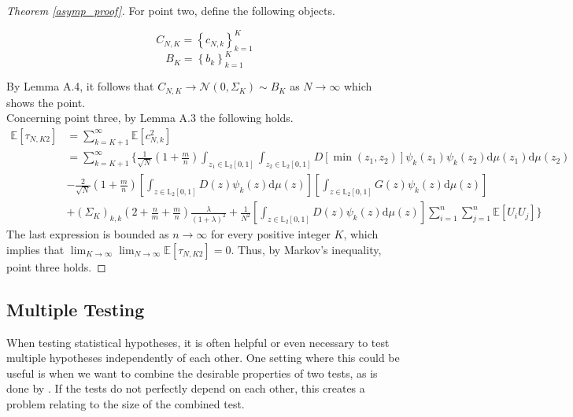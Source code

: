 \documentclass[12pt, a4paper]{article}
\theoremstyle{MAstyle} \newtheorem{assumption}{Assumption}[section]
\theoremstyle{MAstyle} \newtheorem{definition}{Definition}[section]
\theoremstyle{MAstyle} \newtheorem{theorem}{Theorem}[section]
\begin{document}
\begin{proof}[Theorem \ref{asymp_proof}]
		For point two, define the following objects.
		\begin{multicols}{2}
			\noindent
			\begin{equation*}
				C_{N,K} = \left\{c_{N,k}\right\}_{k=1}^K
			\end{equation*}
			\begin{equation}
				B_{K} = \left\{b_{k}\right\}_{k=1}^K
			\end{equation}
		\end{multicols}
		By Lemma A.4, it follows that $C_{N,K} \rightarrow \mathcal{N}(0, \Sigma_K) \sim B_K$ as $N \rightarrow \infty$ which shows the point.\\
		
		Concerning point three, by Lemma A.3 the following holds.
		\begin{equation}
			\begin{split}
				\mathbb{E}[\tau_{N,K2}] &= \sum_{k = K+1}^{\infty} \mathbb{E}[c_{N,k}^2] \\
				&= \sum_{k = K+1}^{\infty} \Bigg\{ \frac{1}{\sqrt{N}} \left(1 + \frac{m}{n}\right) \int_{z_1 \in \mathbb{L}_2[0,1]} \int_{z_2 \in \mathbb{L}_2[0,1]} D\left[\min(z_1, z_2)\right] \psi_k(z_1) \psi_k(z_2) \mathrm{d}\mu(z_1) \mathrm{d}\mu(z_2) \\
				& - \frac{2}{\sqrt{N}} \left(1 + \frac{m}{n}\right) \left[\int_{z \in \mathbb{L}_2[0,1]} D(z) \psi_k(z) \mathrm{d}\mu(z) \right] \left[\int_{z \in \mathbb{L}_2[0,1]} G(z) \psi_k(z) \mathrm{d}\mu(z) \right] \\
				& + \left(\Sigma_K\right)_{k,k} \left(2 + \frac{n}{m} + \frac{m}{n}\right) \frac{\lambda}{(1 + \lambda)^2} + \frac{1}{N^2} \left[\int_{z \in \mathbb{L}_2[0,1]} D(z) \psi_k(z) \mathrm{d}\mu(z) \right] \sum_{i = 1}^{n}\sum_{j = 1}^{n} \mathbb{E}\left[U_i U_j\right]\Bigg\}
			\end{split}
		\end{equation}
	The last expression is bounded as $n \rightarrow \infty$ for every positive integer $K$, which implies that $\lim_{K \rightarrow \infty} \lim_{N \rightarrow \infty} \mathbb{E}\left[\tau_{N,K2}\right] = 0$. Thus, by Markov's inequality, point three holds.
		\end{proof}
	
			
		\subsection{Multiple Testing}\label{Multiple_Testing}
			When testing statistical hypotheses, it is often helpful or even necessary to test multiple hypotheses independently of each other. One setting where this could be useful is when we want to combine the desirable properties of two tests, as is done by \cite{bugni_permutation_2021}. If the tests do not perfectly depend on each other, this creates a problem relating to the size of the combined test.
			
\end{document}
